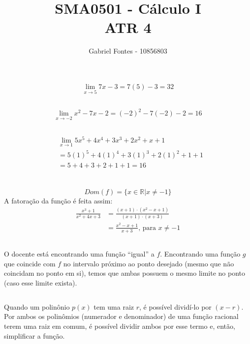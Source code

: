 \documentclass[12pt]{article}
\title{SMA0501 - Cálculo I \\ ATR 4}%
\author{Gabriel Fontes - 10856803}%
\begin{document}
\maketitle

\section{}
\subsection{}
\[
	\lim_{x \rightarrow 5} 7x - 3 = 7(5) - 3 = 32
\]
\subsection{}
\[
	\lim_{x \rightarrow -2} x^2 - 7x - 2 = {(-2)}^2 - 7(-2) -2 = 16
\]
\subsection{}
\begin{align*}
	&\lim_{x \rightarrow 1} 5x^5 + 4x^4 + 3x^3 + 2x^2 + x + 1 \\
	&= 5{(1)}^5 + 4{(1)}^4 + 3{(1)}^3 + 2{(1)}^2 + 1 + 1 \\
	&= 5+4+3+2+1+1 = 16
\end{align*}

\section{}
\subsection{}
\[
	Dom(f) = \{x \in \mathbb{R} | x \ne -1\}
\]
A fatoração da função é feita assim:
\begin{align*}
	\frac{x^3 + 1}{x^2 + 4x +3} &= \frac{(x+1)\cdot(x^2-x+1)}{(x+1)\cdot(x+3)}\\
	&= \frac{x^2 - x +1}{x+3}\text{, para \(x \ne -1\)} 
\end{align*}
\subsection{}
O docente está encontrando uma função ``igual'' a \(f\).
Encontrando uma função \(g\) que coincide com \(f\) no intervalo próximo ao ponto desejado (mesmo que não coincidam no ponto em si), temos que ambas possuem o mesmo limite no ponto (caso esse limite exista).

\subsection{}
Quando um polinônio \(p(x)\) tem uma raiz \(r\), é possível dividí-lo por \((x-r)\). Por ambos os polinômios (numerador e denominador) de uma função racional terem uma raiz em comum, é possível dividir ambos por esse termo e, então, simplificar a função.
\end{document}
